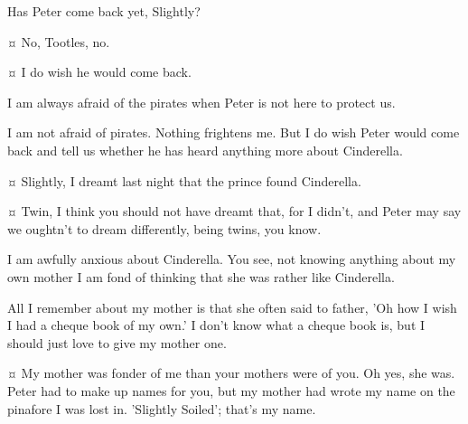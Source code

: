 \begin{drama}

\tootlesspeaks
Has Peter come back yet, Slightly?

\slightlyspeaks {}¤
No, Tootles, no.


\curlyspeaks {}¤
I do wish he would come back.

\tootlesspeaks
I am always afraid of the pirates when Peter is not here to protect us.

\slightlyspeaks
I am not afraid of pirates.
Nothing frightens me.
But I do wish Peter would come back and tell us whether he has heard anything more about Cinderella.

\secondtwinspeaks {}¤
Slightly, I dreamt last night that the prince found Cinderella.

\firsttwinspeaks {}¤
Twin, I think you should not have dreamt that, for I didn't,
and Peter may say we oughtn't to dream differently, being twins, you know.

\tootlesspeaks
I am awfully anxious about Cinderella.
You see, not knowing anything about my own mother I am fond of thinking that she was rather like Cinderella.


\nibsspeaks
All I remember about my mother is that she often said to father, 'Oh how I wish I had a cheque book of my own.'
I don't know what a cheque book is, but I should just love to give my mother one.

\slightlyspeaks {}¤
My mother was fonder of me than your mothers were of you.
Oh yes, she was.
Peter had to make up names for you, but my mother had wrote my name on the pinafore I was lost in.
'Slightly Soiled'; that's my name.

\end{drama}

